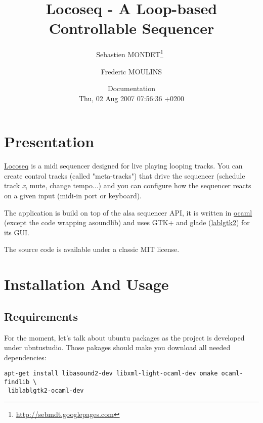 

\title{Locoseq - A Loop-based Controllable Sequencer}
\author{Sebastien MONDET\thanks{\url{http://sebmdt.googlepages.com}}\ \and
Frederic MOULINS}

\date{Documentation\\
Thu, 02 Aug 2007 07:56:36 +0200}






\onecolumn
\maketitle
\tableofcontents

\section{Presentation}

\href{http://locoseq.googlecode.com}{Locoseq} is a midi sequencer designed for
live playing looping tracks.  You can create control tracks (called
"meta-tracks") that drive the sequencer (schedule track \textit{x}, mute,
change tempo...) and you can configure how the sequencer reacts on a given
input (midi-in port or keyboard).


The application is build on top of the alsa sequencer API, it is written in
\href{http://www.ocaml.org}{ocaml}
(except the code wrapping asoundlib) and uses GTK+ and glade
(\href {http://wwwfun.kurims.kyoto-u.ac.jp/soft/lsl/lablgtk.html}{lablgtk2})
for its GUI.

The source code is available under a classic MIT license.



\section{Installation And Usage}

\subsection{Requirements}

For the moment, let's talk about ubuntu packages as the project is developed
under ubntustudio. Those pakages should make you download all needed
dependencies:

\begin{verbatim}
apt-get install libasound2-dev libxml-light-ocaml-dev omake ocaml-findlib \
 liblablgtk2-ocaml-dev
\end{verbatim}

